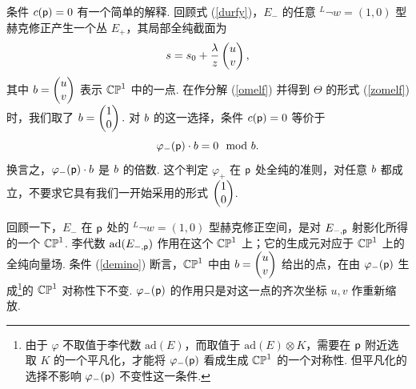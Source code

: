 条件 $c(\pp)=0$ 有一个简单的解释.
回顾式 (\ref{durfy})，$E_-$ 的任意 $^L\neg w=(1,0)$ 型赫克修正产生一个丛 $E_+$，其局部全纯截面为
\begin{equation}\label{zonkey}s=s_0+\frac{\lambda}{z}\begin{pmatrix}u\cr v\end{pmatrix}, \end{equation}
其中 $\bb=\begin{pmatrix}u\cr v\end{pmatrix}$ 表示 $\Bbb{CP}^1$ 中的一点.
在作分解 (\ref{omelf}) 并得到 $\Theta$ 的形式 (\ref{zomelf}) 时，我们取了 $\bb=
\begin{pmatrix}1\cr 0\end{pmatrix}.$
对 $\bb$ 的这一选择，条件 $c(\pp)=0$ 等价于
\begin{equation}\label{demino}\varphi_-(\pp)\cdot \bb=0 ~~{\rm{mod}}~
\bb.
\end{equation}
换言之，$\varphi_-(\pp)\cdot \bb$ 是 $\bb$ 的倍数.
这个判定 $\varphi_+$ 在 $\pp$ 处全纯的准则，对任意 $\bb$ 都成立，不要求它具有我们一开始采用的形式 $\begin{pmatrix} 1\cr 0\end{pmatrix}$.

回顾一下，$E_-$ 在 $\pp$ 处的 $^L\neg w=(1,0)$ 型赫克修正空间，是对 $E_{-,\pp}$ 射影化所得的一个 $\CP^1$.
李代数 $\ad(E_{-,\pp})$ 作用在这个 $\CP^1$ 上；它的生成元对应于 $\CP^1$ 上的全纯向量场.
条件 (\ref{demino}) 断言，$\CP^1$ 中由 $\bb=\begin{pmatrix}u\cr v\end{pmatrix}$ 给出的点，在由 $\varphi_-(\pp)$ 生成\footnote{由于 $\varphi$ 不取值于李代数 $\mathrm{ad}(E)$，而取值于 $\mathrm{ad}(E)\otimes K$，需要在 $\pp$ 附近选取 $K$ 的一个平凡化，才能将 $\varphi_-(\pp)$ 看成生成 $\CP^1$ 的一个对称性.
但平凡化的选择不影响 $\varphi_-(\pp)$ 不变性这一条件.}的 $\CP^1$ 对称性下不变.
$\varphi_-(\pp)$ 的作用只是对这一点的齐次坐标 $u,v$ 作重新缩放.

